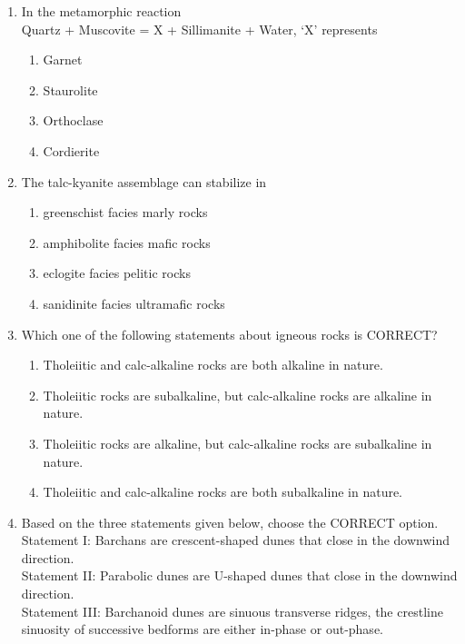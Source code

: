 \documentclass[journal,12pt,onecolumn]{IEEEtran}
\begin{document}
\begin{enumerate}
\item In the metamorphic reaction \\ Quartz + Muscovite = X + Sillimanite + Water, `X' represents

\hfill{}
\begin{multicols}{2}
\begin{enumerate}
    \item Garnet
    \item Staurolite
    \item Orthoclase
    \item Cordierite
\end{enumerate}
\end{multicols}

\item The talc-kyanite assemblage can stabilize in

\hfill{}
\begin{multicols}{2}
\begin{enumerate}
    \item greenschist facies marly rocks
    \item amphibolite facies mafic rocks
    \item eclogite facies pelitic rocks
    \item sanidinite facies ultramafic rocks
\end{enumerate}
\end{multicols}

\item Which one of the following statements about igneous rocks is CORRECT?

\hfill{}
\begin{enumerate}
    \item Tholeiitic and calc-alkaline rocks are both alkaline in nature.
    \item Tholeiitic rocks are subalkaline, but calc-alkaline rocks are alkaline in nature.
    \item Tholeiitic rocks are alkaline, but calc-alkaline rocks are subalkaline in nature.
    \item Tholeiitic and calc-alkaline rocks are both subalkaline in nature.
\end{enumerate}

\item Based on the three statements given below, choose the CORRECT option.\\
Statement I: Barchans are crescent-shaped dunes that close in the downwind direction.\\
Statement II: Parabolic dunes are U-shaped dunes that close in the downwind direction.\\
Statement III: Barchanoid dunes are sinuous transverse ridges, the crestline sinuosity of successive bedforms are either in-phase or out-phase.


\end{enumerate}
\end{document}
